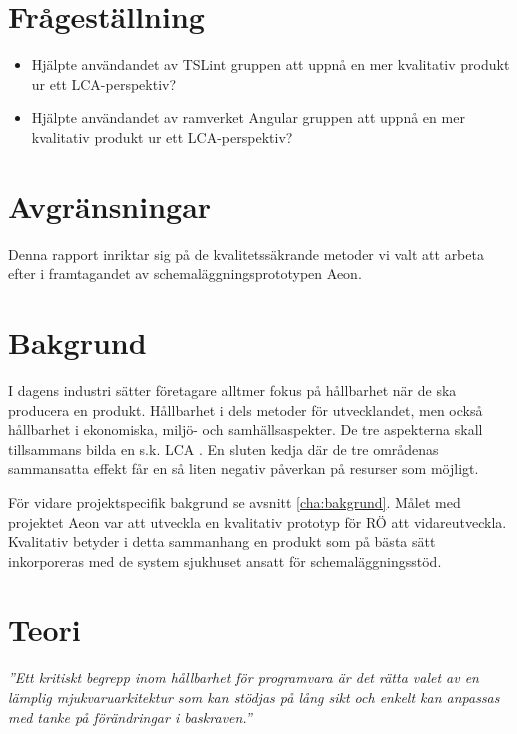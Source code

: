 \section{Frågeställning}

\begin{itemize}
	\item Hjälpte användandet av TSLint gruppen att uppnå en mer kvalitativ produkt ur ett LCA-perspektiv?
	\item Hjälpte användandet av ramverket Angular gruppen att uppnå en mer kvalitativ produkt ur ett LCA-perspektiv?
\end{itemize}

\section{Avgränsningar}
Denna rapport inriktar sig på de kvalitetssäkrande metoder vi valt att arbeta efter i framtagandet av schemaläggningsprototypen Aeon.

\section{Bakgrund}
I dagens industri sätter företagare alltmer fokus på hållbarhet när de ska producera en produkt. Hållbarhet i dels metoder för utvecklandet, men också hållbarhet i ekonomiska, miljö- och samhällsaspekter.
De tre aspekterna skall tillsammans bilda en s.k. LCA \cite{LCA}. En sluten kedja där de tre områdenas sammansatta effekt får en så liten negativ påverkan på resurser som möjligt.

För vidare projektspecifik bakgrund se avsnitt \ref{cha:bakgrund}.
Målet med projektet Aeon var att utveckla en kvalitativ prototyp för RÖ att vidareutveckla. Kvalitativ betyder i detta sammanhang en produkt som på bästa sätt inkorporeras med de system sjukhuset ansatt för schemaläggningsstöd.

\section{Teori}

\vspace{0.5em}
\begin{minipage}{1\linewidth}
\begin{center}

\emph{''Ett kritiskt begrepp inom hållbarhet för programvara är det rätta valet av en lämplig mjukvaruarkitektur som kan stödjas på lång sikt och enkelt kan anpassas med tanke på förändringar i baskraven.''} \cite{sustainable}

\end{center}
\end{minipage}

